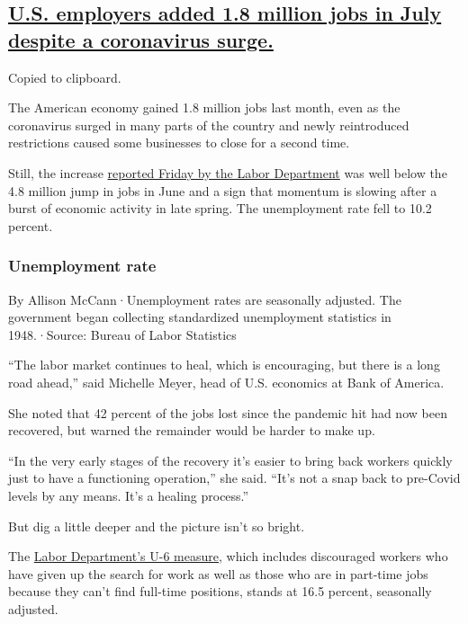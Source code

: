 \hypertarget{us-employers-added-18-million-jobs-in-july-despite-a-coronavirus-surge}{%
\subsection{\texorpdfstring{\protect\hyperlink{us-employers-added-1-8-million-jobs-in-july-despite-a-coronavirus-surge}{U.S.
employers added 1.8 million jobs in July despite a coronavirus
surge.}}{U.S. employers added 1.8 million jobs in July despite a coronavirus surge.}}\label{us-employers-added-18-million-jobs-in-july-despite-a-coronavirus-surge}}

Copied to clipboard.

The American economy gained 1.8 million jobs last month, even as the
coronavirus surged in many parts of the country and newly reintroduced
restrictions caused some businesses to close for a second time.

Still, the increase
\href{https://www.bls.gov/news.release/empsit.nr0.htm}{reported Friday
by the Labor Department} was well below the 4.8 million jump in jobs in
June and a sign that momentum is slowing after a burst of economic
activity in late spring. The unemployment rate fell to 10.2 percent.

\hypertarget{unemployment-rate}{%
\subsubsection{Unemployment rate}\label{unemployment-rate}}

By Allison McCann·Unemployment rates are seasonally adjusted. The
government began collecting standardized unemployment statistics in
1948.·Source: Bureau of Labor Statistics

``The labor market continues to heal, which is encouraging, but there is
a long road ahead,'' said Michelle Meyer, head of U.S. economics at Bank
of America.

She noted that 42 percent of the jobs lost since the pandemic hit had
now been recovered, but warned the remainder would be harder to make up.

``In the very early stages of the recovery it's easier to bring back
workers quickly just to have a functioning operation,'' she said. ``It's
not a snap back to pre-Covid levels by any means. It's a healing
process.''

But dig a little deeper and the picture isn't so bright.

The \href{https://www.bls.gov/news.release/empsit.t15.htm}{Labor
Department's U-6 measure}, which includes discouraged workers who have
given up the search for work as well as those who are in part-time jobs
because they can't find full-time positions, stands at 16.5 percent,
seasonally adjusted.

